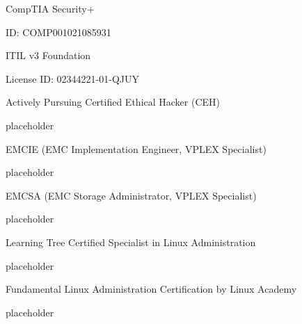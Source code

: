 
\begin{cventries}
  \cventry
    {CompTIA Security+} %
    {} %
    {} %
    {} %
    {
    \begin{cvitems} %
        \item {ID: COMP001021085931}
    \end{cvitems}
    }

  \cventry
    {ITIL v3 Foundation} %
    {} %
    {} %
    {} %
    {
    \begin{cvitems} %
        \item {License ID: 02344221-01-QJUY}
    \end{cvitems}
    }

  \cventry
    {Actively Pursuing Certified Ethical Hacker (CEH)} %
    {} %
    {} %
    {} %
    {
    \begin{cvitems} %
        \item {placeholder}
    \end{cvitems}
    }

  \cventry
    {EMCIE (EMC Implementation Engineer, VPLEX Specialist)} %
    {} %
    {} %
    {} %
    {
    \begin{cvitems} %
        \item {placeholder}
    \end{cvitems}
    }

  \cventry
    {EMCSA (EMC Storage Administrator, VPLEX Specialist)} %
    {} %
    {} %
    {} %
    {
    \begin{cvitems} %
        \item {placeholder}
    \end{cvitems}
    }

  \cventry
    {Learning Tree Certified Specialist in Linux Administration} %
    {} %
    {} %
    {} %
    {
    \begin{cvitems} %
        \item {placeholder}
    \end{cvitems}
    }

  \cventry
    {Fundamental Linux Administration Certification by Linux Academy} %
    {} %
    {} %
    {} %
    {
    \begin{cvitems} %
        \item {placeholder}
    \end{cvitems}
    }

\end{cventries}

